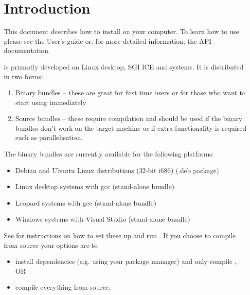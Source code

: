 %
%
%

\chapter{Introduction}
This document describes how to install \esfinley on your computer.
To learn how to use \esfinley please see the User's guide or, for more detailed
information, the API documentation.

\esfinley is primarily developed on Linux desktop, SGI ICE and \macosx systems.
It is distributed in two forms:
\begin{enumerate}
    \item Binary bundles -- these are great for first time users or for those who want to start using \esfinley immediately
    \item Source bundles -- these require compilation and should be used if the binary bundles don't work on the target machine or if extra functionality is required such as \mpi parallelisation.
\end{enumerate}

The binary bundles are currently available for the following platforms:
\begin{itemize}
    \item Debian and Ubuntu Linux distributions ($32$-bit i686) (.deb package)
    \item Linux desktop systems with gcc (stand-alone bundle)
    \item \macosx Leopard systems with gcc (stand-alone bundle)
    \item Windows systems with Visual Studio (stand-alone bundle) 
\end{itemize}

See  for instructions on how to set these up and run \esfinley.
If you choose to compile from source your options are to
\begin{itemize}
    \item install dependencies (e.g. using your package manager) and only compile \esfinley, OR
    \item compile everything from source.
\end{itemize}

